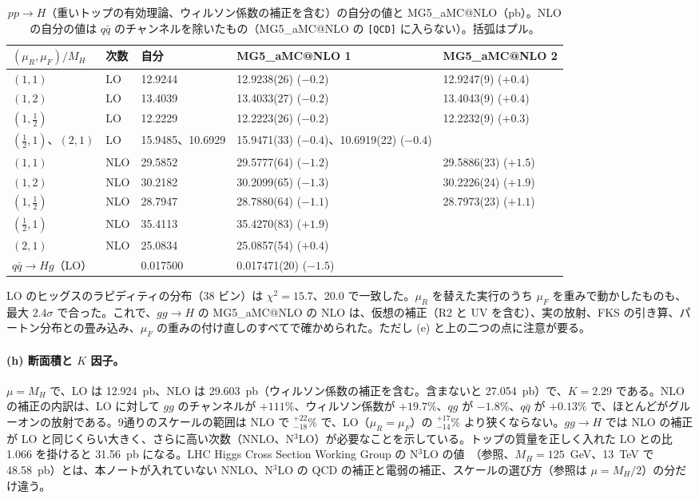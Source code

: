 \documentclass[a4paper,10pt]{ltjsarticle}
\makeatletter
\newcommand{\MGaMC}{MG5\_aMC@NLO}
\makeatother
\begin{document}
\begin{table}[htbp]
\centering\small
\caption{$pp\to H$（重いトップの有効理論、ウィルソン係数の補正を含む）の自分の値と \MGaMC{}（pb）。NLO の自分の値は $q\bar q$ のチャンネルを除いたもの（\MGaMC{} の \texttt{[QCD]} に入らない）。括弧はプル。}
\label{tab:ghtot}
\begin{tabular}{lllll}
\toprule
$(\mu_R,\mu_F)/M_H$ & 次数 & 自分 & \MGaMC{} 1 & \MGaMC{} 2 \\
\midrule
$(1,1)$ & LO & 12.9244 & 12.9238(26) ($-0.2$) & 12.9247(9) ($+0.4$) \\
$(1,2)$ & LO & 13.4039 & 13.4033(27) ($-0.2$) & 13.4043(9) ($+0.4$) \\
$(1,\frac12)$ & LO & 12.2229 & 12.2223(26) ($-0.2$) & 12.2232(9) ($+0.3$) \\
$(\frac12,1)$、$(2,1)$ & LO & 15.9485、10.6929 & 15.9471(33) ($-0.4$)、10.6919(22) ($-0.4$) & \\
$(1,1)$ & NLO & 29.5852 & 29.5777(64) ($-1.2$) & 29.5886(23) ($+1.5$) \\
$(1,2)$ & NLO & 30.2182 & 30.2099(65) ($-1.3$) & 30.2226(24) ($+1.9$) \\
$(1,\frac12)$ & NLO & 28.7947 & 28.7880(64) ($-1.1$) & 28.7973(23) ($+1.1$) \\
$(\frac12,1)$ & NLO & 35.4113 & 35.4270(83) ($+1.9$) & \\
$(2,1)$ & NLO & 25.0834 & 25.0857(54) ($+0.4$) & \\
\midrule
$q\bar q\to Hg$（LO） & & 0.017500 & 0.017471(20) ($-1.5$) & \\
\bottomrule
\end{tabular}
\end{table}

LO のヒッグスのラピディティの分布（38 ビン）は $\chi^2=15.7$、20.0 で一致した。$\mu_R$ を替えた実行のうち $\mu_F$ を重みで動かしたものも、最大 $2.4\sigma$ で合った。これで、$gg\to H$ の \MGaMC{} の NLO は、仮想の補正（R2 と UV を含む）、実の放射、FKS の引き算、パートン分布との畳み込み、$\mu_F$ の重みの付け直しのすべてで確かめられた。ただし (e) と上の二つの点に注意が要る。

\paragraph{(h) 断面積と $K$ 因子。}$\mu=M_H$ で、LO は 12.924~pb、NLO は 29.603~pb（ウィルソン係数の補正を含む。含まないと 27.054~pb）で、$K=2.29$ である。NLO の補正の内訳は、LO に対して $gg$ のチャンネルが $+111\%$、ウィルソン係数が $+19.7\%$、$qg$ が $-1.8\%$、$q\bar q$ が $+0.13\%$ で、ほとんどがグルーオンの放射である。9通りのスケールの範囲は NLO で $^{+22}_{-18}\%$ で、LO（$\mu_R=\mu_F$）の $^{+17}_{-14}\%$ より狭くならない。$gg\to H$ では NLO の補正が LO と同じくらい大きく、さらに高い次数（NNLO、N$^3$LO）が必要なことを示している。トップの質量を正しく入れた LO との比 1.066 を掛けると 31.56~pb になる。LHC Higgs Cross Section Working Group の N$^3$LO の値~\cite{yr4ggh}（参照、$M_H=125$~GeV、13~TeV で 48.58~pb）とは、本ノートが入れていない NNLO、N$^3$LO の QCD の補正と電弱の補正、スケールの選び方（参照は $\mu=M_H/2$）の分だけ違う。
\end{document}
